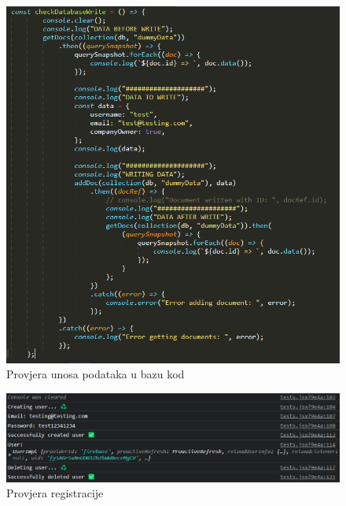             \begin{figure}[H]
			\includegraphics[scale=0.8]{slike/provjera pisanja u bazu kod.png}
			\centering
			\caption{Provjera unosa podataka u bazu kod }
			\label{fig:promjene}
		          \end{figure}

            \begin{figure}[H]
			\includegraphics[scale=0.45]{slike/provjera registracije.png}
			\centering
			\caption{Provjera registracije }
			\label{fig:promjene}
		          \end{figure}

